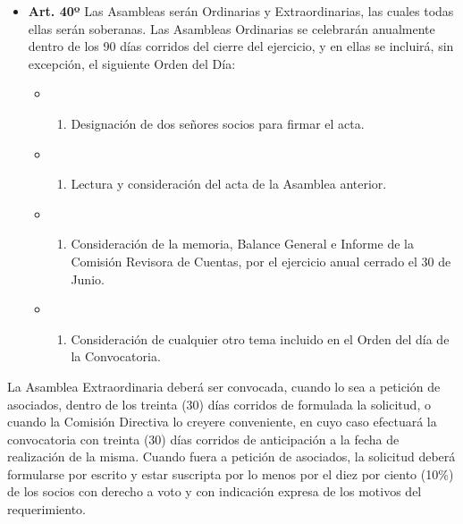 \documentclass[]{book}
\providecommand{\tightlist}{%
  \setlength{\itemsep}{0pt}\setlength{\parskip}{0pt}}
\begin{document}
\begin{itemize}
\tightlist
\item
  \textbf{Art. 40º}
  Las Asambleas serán Ordinarias y Extraordinarias, las cuales todas ellas serán soberanas. Las Asambleas Ordinarias se celebrarán anualmente dentro de los 90 días corridos del cierre del ejercicio, y en ellas se incluirá, sin excepción, el siguiente Orden del Día:

  \begin{itemize}
  \item
    \begin{enumerate}
    \def\labelenumi{\alph{enumi})}
    \tightlist
    \item
      Designación de dos señores socios para firmar el acta.
    \end{enumerate}
  \item
    \begin{enumerate}
    \def\labelenumi{\alph{enumi})}
    \setcounter{enumi}{1}
    \tightlist
    \item
      Lectura y consideración del acta de la Asamblea anterior.
    \end{enumerate}
  \item
    \begin{enumerate}
    \def\labelenumi{\alph{enumi})}
    \setcounter{enumi}{2}
    \tightlist
    \item
      Consideración de la memoria, Balance General e Informe de la Comisión Revisora de Cuentas, por el ejercicio anual cerrado el 30 de Junio.
    \end{enumerate}
  \item
    \begin{enumerate}
    \def\labelenumi{\alph{enumi})}
    \setcounter{enumi}{3}
    \tightlist
    \item
      Consideración de cualquier otro tema incluido en el Orden del día de la Convocatoria.
    \end{enumerate}
  \end{itemize}
\end{itemize}

La Asamblea Extraordinaria deberá ser convocada, cuando lo sea a petición de asociados, dentro de los treinta (30) días corridos de formulada la solicitud, o cuando la Comisión Directiva lo creyere conveniente, en cuyo caso efectuará la convocatoria con treinta (30) días corridos de anticipación a la fecha de realización de la misma. Cuando fuera a petición de asociados, la solicitud deberá formularse por escrito y estar suscripta por lo menos por el diez por ciento (10\%) de los socios con derecho a voto y con indicación expresa de los motivos del requerimiento.
\end{document}
